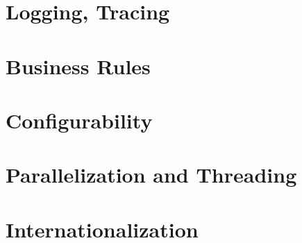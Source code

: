 
\section{Logging, Tracing}
\label{sec:Logging, Tracing}


\section{Business Rules}
\label{sec:Business Rules}


\section{Configurability}
\label{sec:Configurability}


\section{Parallelization and Threading}
\label{sec:Parallelization and Threading}


\section{Internationalization}
\label{sec:Internationalization}


